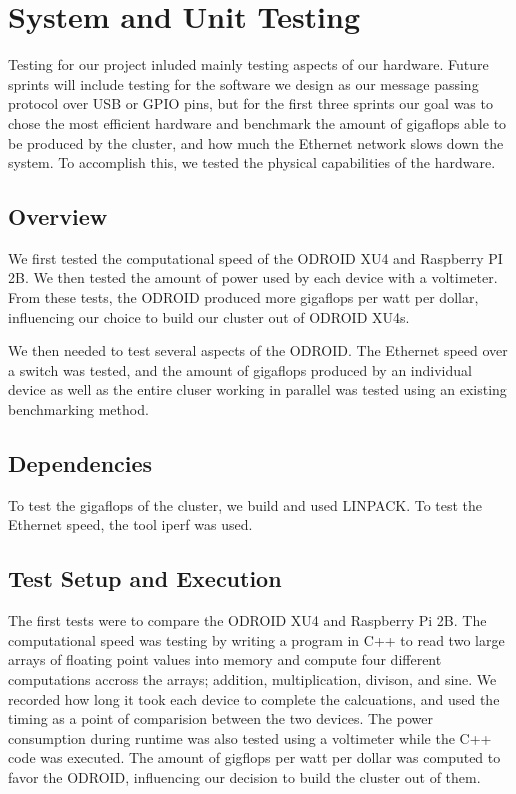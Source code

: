 
\chapter{System  and Unit Testing}

Testing for our project inluded mainly testing aspects of our hardware. Future sprints will include testing for the software we design as our message passing protocol over USB or GPIO pins, but for the first three sprints our goal was to chose the most efficient hardware and benchmark the amount of gigaflops able to be produced by the cluster, and how much the Ethernet network slows down the system. To accomplish this, we tested the physical capabilities of the hardware.

\section{Overview}
We first tested the computational speed of the ODROID XU4 and Raspberry PI 2B. We then tested the amount of power used by each device with a voltimeter. From these tests, the ODROID produced more gigaflops per watt per dollar, influencing our choice to build our cluster out of ODROID XU4s.

We then needed to test several aspects of the ODROID. The Ethernet speed over a switch was tested, and the amount of gigaflops produced by an individual device as well as the entire cluser working in parallel was tested using an existing benchmarking method.

\section{Dependencies}
To test the gigaflops of the cluster, we build and used LINPACK. To test the Ethernet speed, the tool iperf was used.


\section{Test Setup and Execution}
The first tests were to compare the ODROID XU4 and Raspberry Pi 2B. The computational speed was testing by writing a program in C++ to read two large arrays of floating point values into memory and compute four different computations accross the arrays; addition, multiplication, divison, and sine. We recorded how long it took each device to complete the calcuations, and used the timing as a point of comparision between the two devices. The power consumption during runtime was also tested using a voltimeter while the C++ code was executed. The amount of gigflops per watt per dollar was computed to favor the ODROID, influencing our decision to build the cluster out of them.

